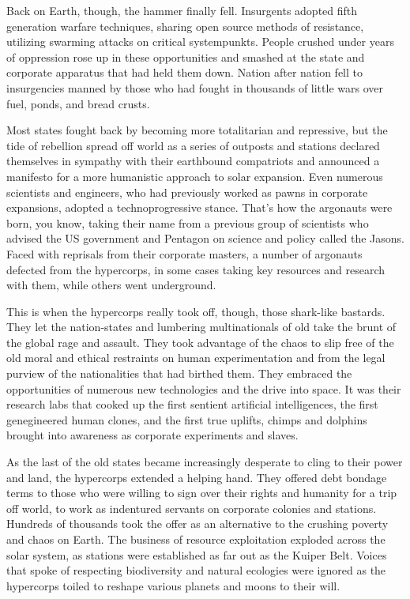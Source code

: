Back on Earth, though, the hammer finally fell. Insurgents adopted fifth generation warfare techniques, sharing open source methods of resistance, utilizing swarming attacks on critical systempunkts. People crushed under years of oppression rose up in these opportunities and smashed at the state and corporate apparatus that had held them down. Nation after nation fell to insurgencies manned by those who had fought in thousands of little wars over fuel, ponds, and bread crusts. 

Most states fought back by becoming more totalitarian and repressive, but the tide of rebellion spread off world as a series of outposts and stations declared themselves in sympathy with their earthbound compatriots and announced a manifesto for a more humanistic approach to solar expansion. Even numerous scientists and engineers, who had previously worked as pawns in corporate expansions, adopted a technoprogressive stance. That's how the argonauts were born, you know, taking their name from a previous group of scientists who advised the US government and Pentagon on science and policy called the Jasons. Faced with reprisals from their corporate masters, a number of argonauts defected from the hypercorps, in some cases taking key resources and research with them, while others went underground. 

This is when the hypercorps really took off, though, those shark-like bastards. They let the nation-states and lumbering multinationals of old take the brunt of the global rage and assault. They took advantage of the chaos to slip free of the old moral and ethical restraints on human experimentation and from the legal purview of the nationalities that had birthed them. They embraced the opportunities of numerous new technologies and the drive into space. It was their research labs that cooked up the first sentient artificial intelligences, the first genegineered human clones, and the first true uplifts, chimps and dolphins brought into awareness as corporate experiments and slaves. 

As the last of the old states became increasingly desperate to cling to their power and land, the hypercorps extended a helping hand. They offered debt bondage terms to those who were willing to sign over their rights and humanity for a trip off world, to work as indentured servants on corporate colonies and stations. Hundreds of thousands took the offer as an alternative to the crushing poverty and chaos on Earth. The business of resource exploitation exploded across the solar system, as stations were established as far out as the Kuiper Belt. Voices that spoke of respecting biodiversity and natural ecologies were ignored as the hypercorps toiled to reshape various planets and moons to their will. 

